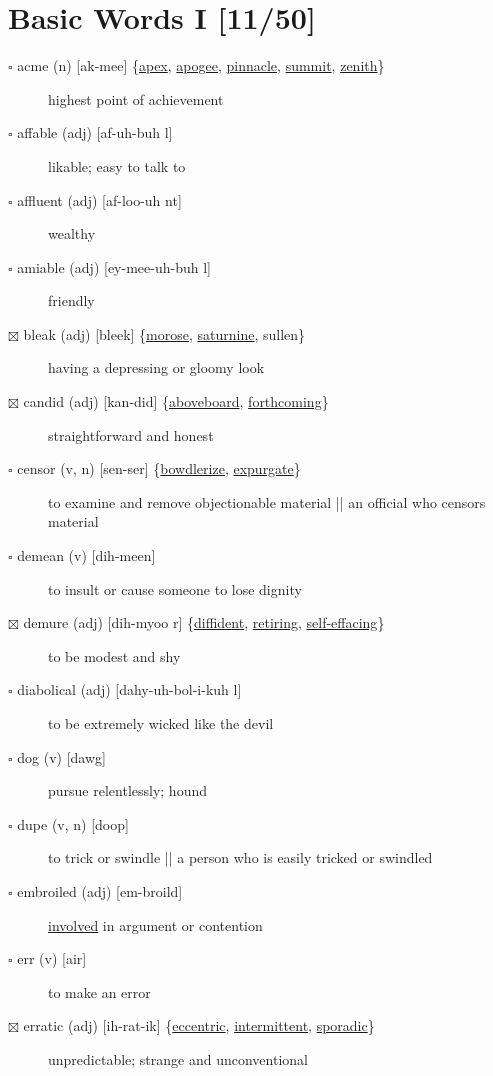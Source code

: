 \documentclass[11pt]{article}
\begin{document}
\section{Basic Words I [11/50]}
\label{sec:orgfe8a9c4}
\begin{description}
\item[{$\square$ \label{orgcd04c21}acme (n) [ak-mee] \{\hyperref[org6b46e9e]{apex}, \hyperref[orge7e78f1]{apogee}, \hyperref[orgc8167b5]{pinnacle}, \hyperref[org9cb55e7]{summit}, \hyperref[org79910cc]{zenith}\}}] highest point of achievement
\item[{$\square$ affable (adj) [af-uh-buh l]}] likable; easy to talk to
\item[{$\square$ affluent (adj) [af-loo-uh nt]}] wealthy
\item[{$\square$ amiable (adj) [ey-mee-uh-buh l]}] friendly
\item[{$\boxtimes$ \label{org37831d4}bleak (adj) [bleek] \{\hyperref[orge33fcaf]{morose}, \hyperref[orgb873785]{saturnine}, sullen\}}] having a depressing or gloomy look
\item[{$\boxtimes$ \label{org28fa9d1}candid (adj) [kan-did] \{\hyperref[org5b88c40]{aboveboard}, \hyperref[org2cb80f0]{forthcoming}\}}] straightforward and honest
\item[{$\square$ \label{org3a963c4}censor (v, n) [sen-ser] \{\hyperref[org5c645ad]{bowdlerize}, \hyperref[orgdf717a8]{expurgate}\}}] to examine and remove objectionable material || an official who censors material
\item[{$\square$ demean (v) [dih-meen]}] to insult or cause someone to lose dignity
\item[{$\boxtimes$ \label{orga7b7e07}demure (adj) [dih-myoo r] \{\hyperref[org76fbc15]{diffident}, \hyperref[org686afa2]{retiring}, \hyperref[org506513a]{self-effacing}\}}] to be modest and shy
\item[{$\square$ diabolical (adj) [dahy-uh-bol-i-kuh l]}] to be extremely wicked like the devil
\item[{$\square$ \label{orgbdc7eb3} \label{orgc2e0328}dog (v) [dawg]}] pursue relentlessly; hound
\item[{$\square$ dupe (v, n) [doop]}] to trick or swindle || a person who is easily tricked or swindled
\item[{$\square$ \label{orgc4738cb} embroiled (adj) [em-broild]}] \hyperref[org59ec861]{involved} in argument or contention
\item[{$\square$ err (v) [air]}] to make an error
\item[{$\boxtimes$ \label{orgdb07f06}erratic (adj) [ih-rat-ik] \{\hyperref[org21ab98d]{eccentric}, \hyperref[orgc65316b]{intermittent}, \hyperref[org154a341]{sporadic}\}}] unpredictable; strange and unconventional

\end{description}
\end{document}
